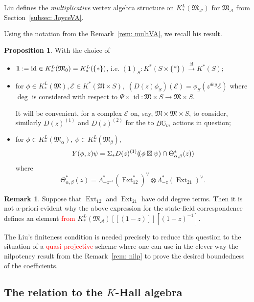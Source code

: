 \documentclass[12pt]{amsart}
\theoremstyle{definition}
\newtheorem{proposition}[definition]{Proposition}
\newtheorem{remark}[definition]{Remark}
\newcommand{\1}{\mathbf 1}
\newcommand{\FM}{{\mathfrak{M}}}
\newcommand{\lpp}{(\hspace{-0.15em}(}
\begin{document}
Liu defines the \textit{multiplicative} vertex algebra structure on $K_*^L(\FM_{\mathcal A})$ for $\FM_{\mathcal A}$ from Section~\ref{subsec: JoyceVA}.

Using the notation from the Remark~\ref{rem: multVA}, we recall his result.

\begin{proposition} With the choice of 
\begin{itemize}
\item $\textbf 1 := \operatorname{id} \in K_*^L(\FM_{0}) = K_*^L(\{*\})$, i.e. $(1)_S: K^*(S \times \{*\}) \xrightarrow{\operatorname{id}} K^*(S);$
\item for $\phi \in K_*^L(\FM), \mathcal E \in K^*(\FM \times S),$ $(D(z)\phi_S)(\mathcal E) = \phi_S(z^{deg}\mathcal E)$
where $\operatorname{deg}$ is considered with respect to $\Psi \times \operatorname{id}: \FM \times S \to \FM \times S$.

It will be convenient, for a complex $\mathcal E$ on, say, $\FM \times \FM \times S$, to consider, similarly $D(z)^{(1)}$ and $D(z)^{(2)}$ for the to $B\mathbb G_m$ actions in question;

\item for $\phi \in K_*^L(\FM_{\alpha})$, $\psi \in K_*^L(\FM_{\beta})$, $$Y(\phi, z)\psi = \Sigma_*D(z)^{(1)}\lpp\phi \boxtimes \psi)\cap \Theta_{\alpha, \beta}^*(z))$$ where
$$\Theta_{\alpha, \beta}^*(z) = \Lambda^*_{-z^{-1}}(\operatorname{Ext}_{12}^*)^{\vee} \otimes \Lambda_{-z}^*(\operatorname{Ext}_{21})^{\vee}.$$
\end{itemize}
\end{proposition}

\begin{remark} 
Suppose that $\operatorname{Ext}_{12}$ and $\operatorname{Ext}_{21}$ have odd degree terms. Then it is not a-priori evident why the above expression for the state-field correspondence defines an element \textcolor{red}{from} $K_*^L(\FM_{\mathcal A})[[(1-z)]][(1-z)^{-1}]$. 

The Liu's finiteness condition is needed precisely to reduce this question to the situation of a \textcolor{red}{quasi-projective} scheme where one can use in the clever way the nilpotency result from the Remark~\ref{rem: nilp} to prove the desired boundedness of the coefficients.
\end{remark}
\fi

\subsection{The relation to the $K$-Hall algebra}
\end{document}
